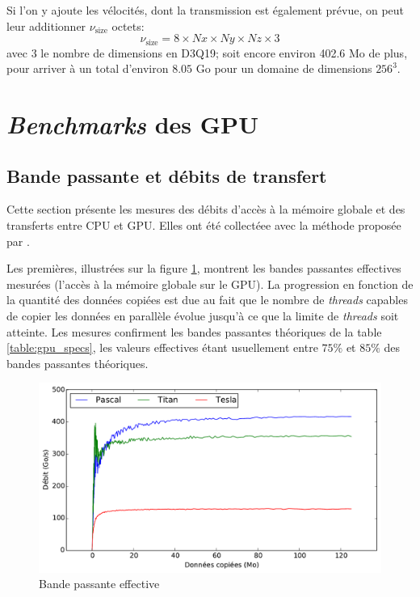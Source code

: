 Si l'on y ajoute les vélocités, dont la transmission est également prévue, on peut leur additionner $\nu_\mathrm{size}$ octets:
\begin{equation}
\nu_\mathrm{size} = 8 \times Nx \times Ny \times Nz \times 3
\end{equation}
avec $3$ le nombre de dimensions en D3Q19; soit encore environ 402.6 Mo de plus, pour arriver à un total d'environ $8.05$ Go pour un domaine de dimensions $256^3$.

\section{\textit{Benchmarks} des \acs{GPU}} \label{title-benchmark_gpu}

\subsection{Bande passante et débits de transfert}
Cette section présente les mesures des débits d'accès à la mémoire globale et des transferts entre \acs{CPU} et \acs{GPU}. Elles ont été collectéee avec la méthode proposée par \cite{ZZZweb_how_2012}.

Les premières, illustrées sur la figure \ref{fig:bandwidth}, montrent les bandes passantes effectives mesurées (l'accès à la mémoire globale sur le \acs{GPU}). La progression en fonction de la quantité des données copiées est due au fait que le nombre de \textit{threads} capables de copier les données en parallèle évolue jusqu'à ce que la limite de \textit{threads} soit atteinte. Les mesures confirment les bandes passantes théoriques de la table \ref{table:gpu_specs}, les valeurs effectives étant usuellement entre $75\%$ et $85\%$ des bandes passantes théoriques.

\begin{figure}[h]
	\centering
	\includegraphics[fbox, scale=0.61]{images/perfs/throughput/bandwidth.pdf}
	\caption{Bande passante effective}
	\label{fig:bandwidth}
\end{figure}

